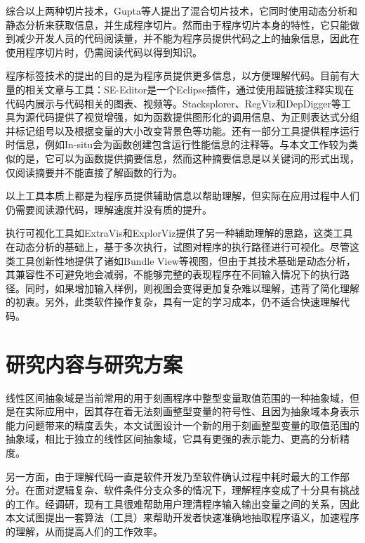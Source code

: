  综合以上两种切片技术，Gupta\cite{gupta1997hybrid}等人提出了混合切片技术，它同时使用动态分析和静态分析来获取信息，并生成程序切片。然而由于程序切片本身的特性，它只能做到减少开发人员的代码阅读量，并不能为程序员提供代码之上的抽象信息，因此在使用程序切片时，仍需阅读代码以得到知识。 
 
 程序标签技术的提出的目的是为程序员提供更多信息，以方便理解代码。目前有大量的相关文章与工具：SE-Editor\cite{schugerl2009beyond}是一个Eclipse插件，通过使用超链接注释实现在代码内展示与代码相关的图表、视频等。Stacksplorer\cite{karrer2011stacksplorer}、RegViz\cite{beck2014regviz}和DepDigger\cite{beyer2010depdigger}等工具为源代码提供了视觉增强，如为函数提供图形化的调用信息、为正则表达式分组并标记组号以及根据变量的大小改变背景色等功能。还有一部分工具提供程序运行时信息，例如In-situ\cite{beck2013situ}会为函数创建包含运行性能信息的注释等。与本文工作较为类似的是\cite{haiduc2010supporting}，它可以为函数提供摘要信息，然而这种摘要信息是以关键词的形式出现，仅阅读摘要并不能直接了解函数的行为。
 
 以上工具本质上都是为程序员提供辅助信息以帮助理解，但实际在应用过程中人们仍需要阅读源代码，理解速度并没有质的提升。 
 
 执行可视化工具如ExtraVis\cite{cornelissen2007understanding}和ExplorViz\cite{fittkau2013live}提供了另一种辅助理解的思路，这类工具在动态分析的基础上，基于多次执行，试图对程序的执行路径进行可视化。尽管这类工具创新性地提供了诸如Bundle View等视图，但由于其技术基础是动态分析，其兼容性不可避免地会减弱，不能够完整的表现程序在不同输入情况下的执行路径。同时，如果增加输入样例，则视图会变得更加复杂难以理解，违背了简化理解的初衷。另外，此类软件操作复杂，具有一定的学习成本，仍不适合快速理解代码。
 
 \section{研究内容与研究方案}
  
线性区间抽象域是当前常用的用于刻画程序中整型变量取值范围的一种抽象域，但是在实际应用中，因其存在着无法刻画整型变量的符号性、且因为抽象域本身表示能力问题带来的精度丢失，本文试图设计一个新的用于刻画整型变量的取值范围的抽象域，相比于独立的线性区间抽象域，它具有更强的表示能力、更高的分析精度。

另一方面，由于理解代码一直是软件开发乃至软件确认过程中耗时最大的工作部分。在面对逻辑复杂、软件条件分支众多的情况下，理解程序变成了十分具有挑战的工作。经调研，现有工具很难帮助用户理清程序输入输出变量之间的关系，因此本文试图提出一套算法（工具）来帮助开发者快速准确地抽取程序语义，加速程序的理解，从而提高人们的工作效率。

